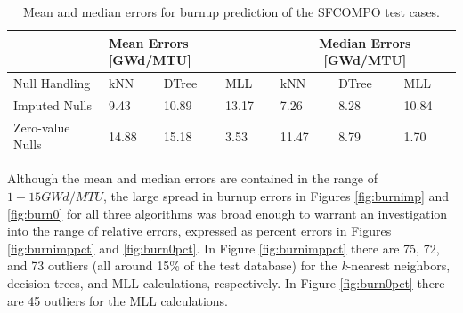 \begin{table}[!htb]
  \centering
  \begin{tabular}{@{}m{1.5in}llllll@{}}
    \toprule
                     & \multicolumn{3}{m{2in}}{Mean Errors [GWd/MTU]} & \multicolumn{3}{c}{Median Errors [GWd/MTU]} \\ \toprule
    Null Handling    & kNN           & DTree         & MLL           & kNN            & DTree          & MLL    \\ \midrule
    Imputed Nulls    & 9.43          & 10.89         & 13.17         & 7.26           & 8.28           & 10.84  \\
    Zero-value Nulls & 14.88         & 15.18         & 3.53          & 11.47          & 8.79           & 1.70   \\ \bottomrule
  \end{tabular}
  \caption{Mean and median errors for burnup prediction of the \gls{SFCOMPO} 
           test cases.}
  \label{tbl:sfcoburn}
\end{table}

Although the mean and median errors are contained in the range of $1-15
GWd/MTU$, the large spread in burnup errors in Figures \ref{fig:burnimp} and
\ref{fig:burn0} for all three algorithms was broad enough to warrant an
investigation into the range of relative errors, expressed as percent errors in
Figures \ref{fig:burnimppct} and \ref{fig:burn0pct}.  In Figure
\ref{fig:burnimppct} there are 75, 72, and 73 outliers (all around 15\% of the
test database) for the \textit{k}-nearest neighbors, decision trees, and
\gls{MLL} calculations, respectively.  In Figure \ref{fig:burn0pct} there are
45 outliers for the \gls{MLL} calculations.

